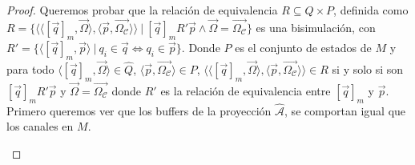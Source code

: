 \begin{proof}

Queremos probar que la relación de equivalencia $R \subseteq \hat{Q} \times P$, definida como $R = \{ \langle \langle [\overrightarrow{q}]_m, \overrightarrow{\Omega} \rangle, \langle \overrightarrow{p}, \overrightarrow{\Omega_{\mathcal{C}}} \rangle \rangle \ | \ [\overrightarrow{q}]_mR'\overrightarrow{p} \land  \overrightarrow{\Omega}=\overrightarrow{\Omega_{\mathcal{C}}} \}$ es una bisimulación, con $R'=\{\langle [\overrightarrow{q}]_m, \overrightarrow{p} \rangle \ | \ q_i \in \overrightarrow{q} \iff q_i \in \overrightarrow{p} \}$. Donde $P$ es el conjunto de estados de $M$ y para todo $\langle [\overrightarrow{q}]_m, \overrightarrow{\Omega} \rangle \in \hat{Q}$, $\langle \overrightarrow{p}, \overrightarrow{\Omega_{\mathcal{C}}} \rangle \in P$, $\langle \langle [\overrightarrow{q}]_m, \overrightarrow{\Omega} \rangle, \langle \overrightarrow{p}, \overrightarrow{\Omega_{\mathcal{C}}} \rangle \rangle \in R$ si y solo si son $[\overrightarrow{q}]_mR'\overrightarrow{p}$ y $\overrightarrow{\Omega}=\overrightarrow{\Omega_{\mathcal{C}}}$ donde $R'$ es la relación de equivalencia entre $[\overrightarrow{q}]_m$ y $\overrightarrow{p}$. \\

Primero queremos ver que los buffers de la proyección $\hat{\mathcal{A}}$, se comportan igual que los canales en $M$.

\begin{itemize}
    
    

\end{itemize}
\end{proof}

